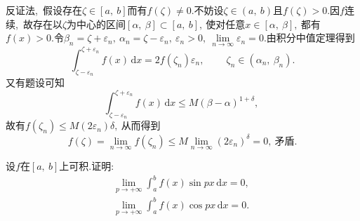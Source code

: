 	\begin{solution}
		反证法,\ 假设存在$\zeta\in\left[a,\ b\right]$而有$f(\zeta)\neq 0.$不妨设$\zeta\in\left(a,\ b\right)$且$f(\zeta)>0.$因$f$连续,\ 故存在以$\zeta$为中心的区间$\left[\alpha,\ \beta\right]\subset\left[a,\ b\right],\ $使对任意$x\in\left[\alpha,\ \beta\right],\ $都有$f(x)>0.$令$\beta_n=\zeta + \varepsilon_n,\ \alpha_n=\zeta-\varepsilon_n,\ \varepsilon_n>0,\ \lim\limits_{
			n\rightarrow\infty}\varepsilon_n=0.$由积分中值定理得到
		$$\int_{\zeta-\varepsilon_n}^{\zeta+\varepsilon_n}f(x)\,\text{d}x=2f(\zeta_n)\varepsilon_n,\ \qquad \zeta_n\in\left(\alpha_n,\ \beta_n\right).$$
		又有题设可知
		$$\int_{\zeta-\varepsilon_n}^{\zeta+\varepsilon_n}f(x)\,\text{d}x\le M\left(\beta -\alpha\right)^{1+\delta},\ $$
		故有$f(\zeta_n)\le M(2\varepsilon_n)\delta,\ $从而得到
		$$f(\zeta)=\lim\limits_{n\rightarrow \infty}f(\zeta_n)\le M\lim\limits_{n\rightarrow\infty}(2\varepsilon_n)^\delta=0,\ \text{矛盾.}$$ 
	\end{solution}
	\newpage
	\begin{problem}
		设$f$在$\left[a,\ b\right]$上可积.证明:
		\begin{align*}
			\lim\limits_{p\rightarrow+\infty}\int_{a}^{b}f(x)\sin px\,\text{d}x=0,\ \\
			\lim\limits_{p\rightarrow+\infty}\int_{a}^{b}f(x)\cos px\,\text{d}x=0.
		\end{align*}
	\end{problem}
	
